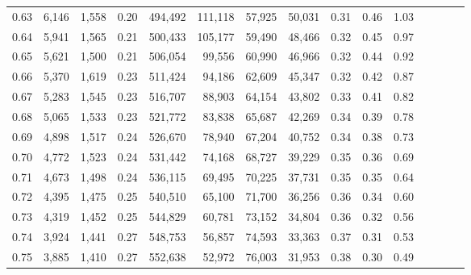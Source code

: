 \begin{tabular}{rrrcrrrrrrrrrrr}
0.63 &   6,146 &  1,558 &                                       0.20 &  494,492 &  111,118 &   57,925 &   50,031 &  0.31 &  0.46 &                         1.03 \\
0.64 &   5,941 &  1,565 &                                       0.21 &  500,433 &  105,177 &   59,490 &   48,466 &  0.32 &  0.45 &                         0.97 \\
0.65 &   5,621 &  1,500 &                                       0.21 &  506,054 &   99,556 &   60,990 &   46,966 &  0.32 &  0.44 &                         0.92 \\
0.66 &   5,370 &  1,619 &                                       0.23 &  511,424 &   94,186 &   62,609 &   45,347 &  0.32 &  0.42 &                         0.87 \\
0.67 &   5,283 &  1,545 &                                       0.23 &  516,707 &   88,903 &   64,154 &   43,802 &  0.33 &  0.41 &                         0.82 \\
0.68 &   5,065 &  1,533 &                                       0.23 &  521,772 &   83,838 &   65,687 &   42,269 &  0.34 &  0.39 &                         0.78 \\
0.69 &   4,898 &  1,517 &                                       0.24 &  526,670 &   78,940 &   67,204 &   40,752 &  0.34 &  0.38 &                         0.73 \\
0.70 &   4,772 &  1,523 &                                       0.24 &  531,442 &   74,168 &   68,727 &   39,229 &  0.35 &  0.36 &                         0.69 \\
0.71 &   4,673 &  1,498 &                                       0.24 &  536,115 &   69,495 &   70,225 &   37,731 &  0.35 &  0.35 &                         0.64 \\
0.72 &   4,395 &  1,475 &                                       0.25 &  540,510 &   65,100 &   71,700 &   36,256 &  0.36 &  0.34 &                         0.60 \\
0.73 &   4,319 &  1,452 &                                       0.25 &  544,829 &   60,781 &   73,152 &   34,804 &  0.36 &  0.32 &                         0.56 \\
0.74 &   3,924 &  1,441 &                                       0.27 &  548,753 &   56,857 &   74,593 &   33,363 &  0.37 &  0.31 &                         0.53 \\
0.75 &   3,885 &  1,410 &                                       0.27 &  552,638 &   52,972 &   76,003 &   31,953 &  0.38 &  0.30 &                         0.49 \\

\end{tabular}
